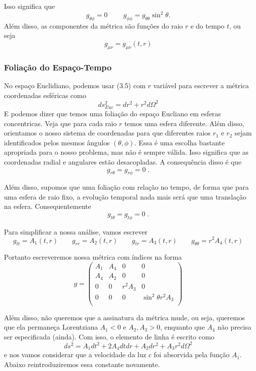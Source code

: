 \documentclass[11pt]{article}
\begin{document}
Isso significa que \[ \tag{3.8}  \boxed{g_{\theta \phi} = 0}\; \qquad 
\boxed{g_{\phi\phi}   = g_{\theta\theta} \sin^2\theta }. \] Além disso,
as componentes da métrica são funções do raio \(r\) e do tempo \(t\), ou
seja \[ \tag{3.9}  \boxed{g_{\mu\nu} = g_{\mu\nu}(t,r)}\]

    \hypertarget{foliauxe7uxe3o-do-espauxe7o-tempo}{%
\subsubsection{Foliação do
Espaço-Tempo}\label{foliauxe7uxe3o-do-espauxe7o-tempo}}

    No espaço Euclidiano, podemos usar (3.5) com \(r\) variável para
escrever a métrica coordenadas esféricas como
\[\tag{3.10} ds_{Euc}^2 = dr^2 + r^2 d\Omega^2\] E podemos dizer que
temos uma foliação do espaço Eucliano em esferas concentricas. Veja que
para cada raio \(r\) temos uma esfera diferente. Além disso, orientamos
o nosso sistema de coordenadas para que diferentes raios \(r_1\) e
\(r_2\) sejam identificados pelos mesmos ângulos \((\theta, \phi)\).
Essa é uma escolha bastante apropriada para o nosso problema, mas não é
sempre válida. Isso significa que as coordenadas radial e angulares
estão desacopladas. A consequência disso é que
\[ \tag{3.11} \boxed{g_{r \theta} = g_{r \phi} = 0}\; . \]

Além disso, supomos que uma foliação com relação no tempo, de forma que
para uma esfera de raio fixo, a evolução temporal nada mais será que uma
translação na esfera. Consequentemente
\[ \tag{3.12} \boxed{g_{t \theta} = g_{t \phi} = 0}\; . \]

    Para simplificar a nossa análise, vamos escrever
\[ \tag{3.13} g_{tt} = A_1(t,r)\qquad g_{rr} = A_2(t,r) \qquad g_{tr} = A_3(t,r) \qquad g_{\theta \theta} = r^2 A_4(t,r)\]

Portanto escreveremos nossa métrica com índices na forma
\[ \tag{3.14} g = 
\begin{pmatrix}
A_1 & A_4& 0 & 0 \\
A_4 & A_2 & 0 & 0 \\
0 & 0 & r^2 A_3  & 0 \\
0 & 0 & 0 & \sin^2\theta r^2 A_3 \\
\end{pmatrix} \]

Além disso, não queremos que a assinatura da métrica mude, ou seja,
queremos que ela permaneça Lorentziana \(A_1<0\) e \(A_2, A_3>0\),
enquanto que \(A_4\) não precisa ser especificada (ainda). Com isso, o
elemento de linha é escrito como
\[ \tag{3.15} ds^2 = A_1 dt^2 + 2 A_4 dt dr + A_2 dr^2 + A_3 r^2 d \Omega^2  \]
e nos vamos considerar que a velocidade da luz \(c\) foi absorvida pela
função \(A_1\). Abaixo reintroduziremos essa constante novamente.
\end{document}
